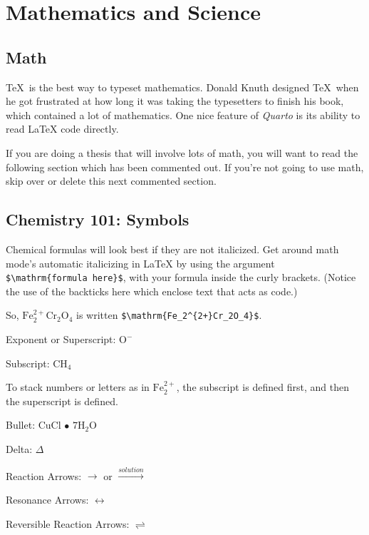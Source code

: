 \documentclass[
  letterpaper,
  12pt,
  twoside]{reedthesis}
\begin{document}

\chapter{Mathematics and Science}\label{math-sci}

\section{Math}\label{math}

\TeX~is the best way to typeset mathematics. Donald Knuth designed
\TeX~when he got frustrated at how long it was taking the typesetters to
finish his book, which contained a lot of mathematics. One nice feature
of \emph{Quarto} is its ability to read LaTeX code directly.

If you are doing a thesis that will involve lots of math, you will want
to read the following section which has been commented out. If you're
not going to use math, skip over or delete this next commented section.

\section{Chemistry 101: Symbols}\label{chemistry-101-symbols}

Chemical formulas will look best if they are not italicized. Get around
math mode's automatic italicizing in LaTeX by using the argument
\texttt{\$\textbackslash{}mathrm\{formula\ here\}\$}, with your formula
inside the curly brackets. (Notice the use of the backticks here which
enclose text that acts as code.)

So, \(\mathrm{Fe_2^{2+}Cr_2O_4}\) is written
\texttt{\$\textbackslash{}mathrm\{Fe\_2\^{}\{2+\}Cr\_2O\_4\}\$}.

\noindent Exponent or Superscript: \(\mathrm{O^-}\)

\noindent Subscript: \(\mathrm{CH_4}\)

To stack numbers or letters as in \(\mathrm{Fe_2^{2+}}\), the subscript
is defined first, and then the superscript is defined.

\noindent Bullet: CuCl \(\bullet\) \(\mathrm{7H_{2}O}\)

\noindent Delta: \(\Delta\)

\noindent Reaction Arrows: \(\longrightarrow\) or
\(\xrightarrow{solution}\)

\noindent Resonance Arrows: \(\leftrightarrow\)

\noindent Reversible Reaction Arrows: \(\rightleftharpoons\)
\end{document}

